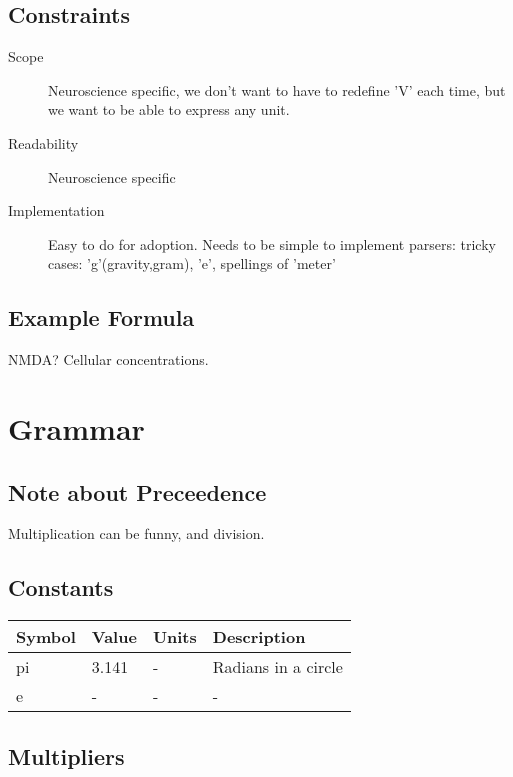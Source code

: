 \documentclass{article}
\begin{document}
\subsection{Constraints}
\begin{description}
\item[Scope] Neuroscience specific, we don't want to have to redefine 'V' each time, but we want to be able to express any unit.
\item[Readability] Neuroscience specific 
\item[Implementation] Easy to do for adoption. Needs to be simple to implement parsers: tricky cases: 'g'(gravity,gram), 'e', spellings of 'meter'
\end{description}

\subsection{Example Formula}
\begin{description}
\item NMDA? Cellular concentrations.
\end{description}



\newpage
\section*{Grammar}


\subsection*{Note about Preceedence}
Multiplication can be funny, and division.


\subsection*{Constants}
\begin{center}
    \begin{tabular}{ | l | l |  l | p{5cm} |}
    \hline
    Symbol & Value & Units & Description  \\ \hline
    pi & 3.141 & - & Radians in a circle \\ \hline
    e & - & - & - \\ \hline
    \end{tabular}
\end{center}


\subsection*{Multipliers}
\end{document}
